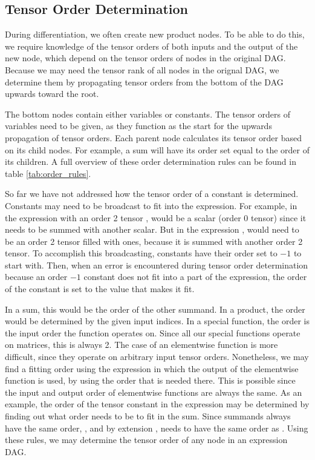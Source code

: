 \documentclass[12pt, a4paper]{report}
\begin{document}
\subsection{Tensor Order Determination}
During differentiation, we often create new product nodes.
To be able to do this, we require knowledge of the tensor orders of both inputs and the output of the new node, which depend on the tensor orders of nodes in the original DAG.
Because we may need the tensor rank of all nodes in the orignal DAG, we determine them by propagating tensor orders from the bottom of the DAG upwards toward the root.

The bottom nodes contain either variables or constants.
The tensor orders of variables need to be given, as they function as the start for the upwards propagation of tensor orders.
Each parent node calculates its tensor order based on its child nodes.
For example, a sum will have its order set equal to the order of its children.
A full overview of these order determination rules can be found in table \ref{tab:order_rules}.

So far we have not addressed how the tensor order of a constant is determined.
Constants may need to be broadcast to fit into the expression.
For example, in the expression  with an order 2 tensor ,  would be a scalar (order 0 tensor) since it needs to be summed with another scalar.
But in the expression ,  would need to be an order 2 tensor filled with ones, because it is summed with another order 2 tensor.
To accomplish this broadcasting, constants have their order set to $-1$ to start with.
Then, when an error is encountered during tensor order determination because an order $-1$ constant does not fit into a part of the expression, the order of the constant is set to the value that makes it fit.

In a sum, this would be the order of the other summand.
In a product, the order would be determined by the given input indices.
In a special function, the order is the input order the function operates on. Since all our special functions operate on matrices, this is always 2.
The case of an elementwise function is more difficult, since they operate on arbitrary input tensor orders.
Nonetheless, we may find a fitting order using the expression in which the output of the elementwise function is used, by using the order that is needed there.
This is possible since the input and output order of elementwise functions are always the same.
As an example, the order of the tensor constant  in the expression  may be determined by finding out what order  needs to be to fit in the sum.
Since summands always have the same order, , and by extension , needs to have the same order as .
Using these rules, we may determine the tensor order of any node in an expression DAG.
\end{document}
